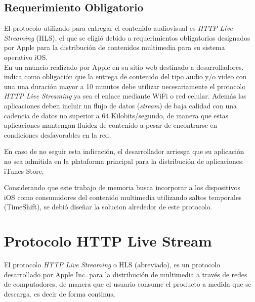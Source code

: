 \subsection{Requerimiento Obligatorio}
	El protocolo utilizado para entregar el contenido audiovisual es \textit{HTTP Live Streaming} (HLS), el que se eligió debido a requerimientos obligatorios designados por Apple para la distribución de contenidos multimedia para su sistema operativo iOS.\\
	
	En un anuncio realizado por Apple en su sitio web destinado a desarrolladores, indica como obligación que la entrega de contenido del tipo audio y/o video con una una duración mayor a 10 minutos debe utilizar necesariamente el protocolo \textit{HTTP Live Streaming} ya sea el enlace mediante WiFi o red celular. Además las aplicaciones deben incluir un flujo de datos (\textit{stream}) de baja calidad con una cadencia de datos no superior a 64 Kilobits/segundo, de manera que estas aplicaciones mantengan fluidez de contenido a pesar de encontrarse en condiciones desfavorables en la red.
	
	En caso de no seguir esta indicación, el desarrollador arriesga que su aplicación no sea admitida en la plataforma principal para la distribución de aplicaciones: iTunes Store.

	Considerando que este trabajo de memoria busca incorporar a los dispositivos iOS como consumidores del contenido multimedia utilizando saltos temporales (TimeShift), se debió diseñar la solucion alrededor de este protocolo.


\section{Protocolo HTTP Live Stream}

El protocolo \textit{HTTP Live Streaming} o HLS (abreviado), es un protocolo desarrollado por Apple Inc. para la distribución de multimedia a través de redes de computadores, de manera que el usuario consume el producto a medida que se descarga, es decir de forma continua.\\

